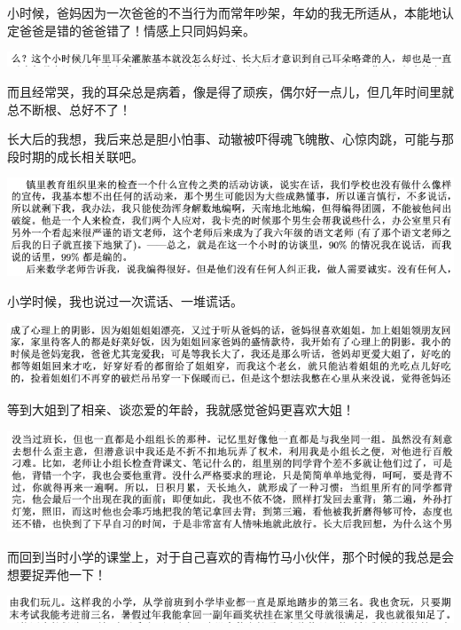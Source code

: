 \documentclass[9pt, b5paper]{article}
\begin{document}
小时候，爸妈因为一次爸爸的不当行为而常年吵架，年幼的我无所适从，本能地认定爸爸是错的爸爸错了！情感上只同妈妈亲。

\begin{center}
\includegraphics[width=.9\linewidth]{./pic/backups_plans_20210422_114555.png}
\end{center}

而且经常哭，我的耳朵总是病着，像是得了顽疾，偶尔好一点儿，但几年时间里就总不断根、总好不了！

长大后的我想，我后来总是胆小怕事、动辙被吓得魂飞魄散、心惊肉跳，可能与那段时期的成长相关联吧。

\begin{center}
\includegraphics[width=.9\linewidth]{./pic/backups_plans_20210422_101017.png}
\end{center}

小学时候，我也说过一次谎话、一堆谎话。

\begin{center}
\includegraphics[width=.9\linewidth]{./pic/backups_plans_20210422_101254.png}
\end{center}

等到大姐到了相亲、谈恋爱的年龄，我就感觉爸妈更喜欢大姐！

\begin{center}
\includegraphics[width=.9\linewidth]{./pic/backups_plans_20210422_074914.png}
\end{center}

而回到当时小学的课堂上，对于自己喜欢的青梅竹马小伙伴，那个时候的我总是会想要捉弄他一下！

\begin{center}
\includegraphics[width=.9\linewidth]{./pic/backups_plans_20210422_100606.png}
\end{center}
\end{document}
